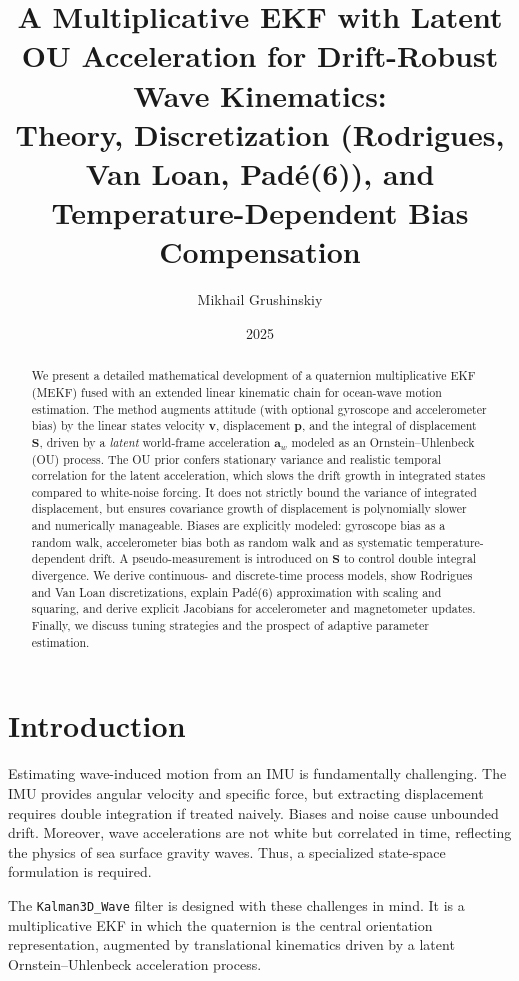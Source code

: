 \documentclass[10pt]{extarticle}
\title{A Multiplicative EKF with Latent OU Acceleration for Drift-Robust Wave Kinematics: \\
Theory, Discretization (Rodrigues, Van Loan, Pad\'e(6)), and Temperature-Dependent Bias Compensation}
\author{Mikhail Grushinskiy}
\date{2025}
\begin{document}
\maketitle

\begin{abstract}
We present a detailed mathematical development of a quaternion multiplicative EKF (MEKF) fused with an extended 
linear kinematic chain for ocean-wave motion estimation. 
The method augments attitude (with optional gyroscope and accelerometer bias) by the linear states velocity $\bm v$, displacement $\bm p$, 
and the integral of displacement $\bm S$, driven by a \emph{latent} world-frame acceleration $\bm a_w$ modeled as an Ornstein--Uhlenbeck (OU) process. The OU prior confers stationary variance and realistic temporal correlation for the latent acceleration, which slows the drift growth in integrated states compared to white-noise forcing. It does not strictly bound the variance of integrated displacement, but ensures covariance growth of displacement is polynomially slower and numerically manageable.
Biases are explicitly modeled: gyroscope bias as a random walk, accelerometer bias both as random walk and as systematic temperature-dependent drift. 
A pseudo-measurement is introduced on $\bm S$ to control double integral divergence. 
We derive continuous- and discrete-time process models, show Rodrigues and Van Loan discretizations, 
explain Pad\'e(6) approximation with scaling and squaring, and derive explicit Jacobians for accelerometer and magnetometer updates. 
Finally, we discuss tuning strategies and the prospect of adaptive parameter estimation.
\end{abstract}

\section{Introduction}
Estimating wave-induced motion from an IMU is fundamentally challenging. The IMU provides angular velocity and specific force, 
but extracting displacement requires double integration if treated naively. Biases and noise cause unbounded drift. 
Moreover, wave accelerations are not white but correlated in time, reflecting the physics of sea surface gravity waves. 
Thus, a specialized state-space formulation is required. 

The \texttt{Kalman3D\_Wave} filter is designed with these challenges in mind. 
It is a multiplicative EKF in which the quaternion is the central orientation representation, 
augmented by translational kinematics driven by a latent Ornstein--Uhlenbeck acceleration process. 
\end{document}
